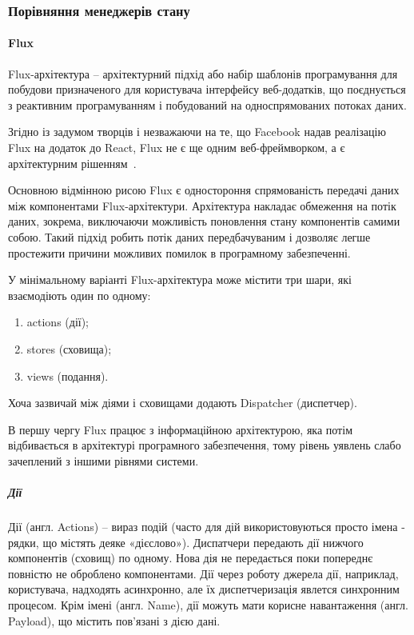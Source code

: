\subsubsection{Порівняння менеджерів стану}

\paragraph{Flux}

Flux-архітектура -- архітектурний підхід або набір шаблонів програмування для побудови призначеного для користувача інтерфейсу веб-додатків, що поєднується з реактивним програмуванням і побудований на односпрямованих потоках даних.

Згідно із задумом творців і незважаючи на те, що Facebook надав реалізацію Flux на додаток до React, Flux не є ще одним веб-фреймворком, а є архітектурним рішенням~\cite{petrenko2015порівняння}.

Основною відмінною рисою Flux є одностороння спрямованість передачі даних між компонентами Flux-архітектури. Архітектура накладає обмеження на потік даних, зокрема, виключаючи можливість поновлення стану компонентів самими собою. Такий підхід робить потік даних передбачуваним і дозволяє легше простежити причини можливих помилок в програмному забезпеченні.

У мінімальному варіанті Flux-архітектура може містити три шари, які взаємодіють один по одному:

\begin{enumerate}
    \item actions (дії);
    \item stores (сховища);
    \item views (подання).
\end{enumerate}

Хоча зазвичай між діями і сховищами додають Dispatcher (диспетчер).

В першу чергу Flux працює з інформаційною архітектурою, яка потім відбивається в архітектурі програмного забезпечення, тому рівень уявлень слабо зачеплений з іншими рівнями системи.

\subparagraph{Дії}
Дії (англ. Actions) -- вираз подій (часто для дій використовуються просто імена - рядки, що містять деяке «дієслово»). Диспатчери передають дії нижчого компонентів (сховищ) по одному. Нова дія не передається поки попереднє повністю не оброблено компонентами. Дії через роботу джерела дії, наприклад, користувача, надходять асинхронно, але їх диспетчеризація явлется синхронним процесом. Крім імені (англ. Name), дії можуть мати корисне навантаження (англ. Payload), що містить пов'язані з дією дані.

